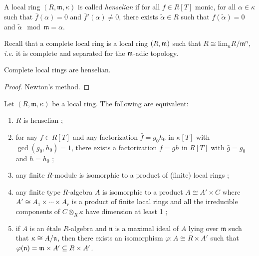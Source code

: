 
\begin{definition}
A local ring $(R, \mathfrak m, \kappa)$ is called \emph{henselian} if for all $f\in R[T]$ monic, for all $\alpha\in \kappa$ such that $\bar f(\alpha)=0$ and $\bar f'(\alpha)\neq 0$, there exists $\tilde\alpha\in R$ such that $f(\tilde\alpha) = 0$ and $\tilde\alpha\mod\mathfrak m = \alpha$. 
\end{definition} 

Recall that a complete local ring is a local ring $(R, \frak m)$ such that  $R\cong \text{lim}_n R/\mathfrak m^n$, {\it i.e.} it is complete and separated for the $\frak m$-adic topology.

\begin{theorem}
Complete local rings are henselian.
\end{theorem}

\begin{proof}
Newton's method.
\end{proof}

\begin{theorem} \label{thm:eqDefHenselian}
Let $(R, \mathfrak m, \kappa)$ be a local ring. The following are equivalent:
\begin{enumerate}
\item $R$ is henselian ;
\item for any $f\in R[T]$ and any factorization $\bar f = g_0 h_0$ in $\kappa[T]$ with $\gcd(g_0,h_0)=1$, there exists a factorization $f=gh$ in $R[T]$ with $\bar g = g_0$ and $\bar h=h_0$ ;
\item any finite $R$-module is isomorphic to a product of (finite) local rings ;
\item any finite type $R$-algebra $A$ is isomorphic to a product $A \cong A' \times C$ where $A' \cong A_1 \times \cdots \times A_r$ is a product of finite local rings and all the irreducible components of $C\otimes_R\kappa$ have dimension at least 1 ;
\item if $A$ is an \'etale $R$-algebra and $\mathfrak n$ is a maximal ideal of $A$ lying over $\mathfrak m$ such that $\kappa \cong A/\frak n$, then there exists an isomorphism $\varphi: A \cong R\times A'$ such that $\varphi(\frak n) = \frak m \times A'\subseteq R\times A'$.
\end{enumerate}
\end{theorem}


